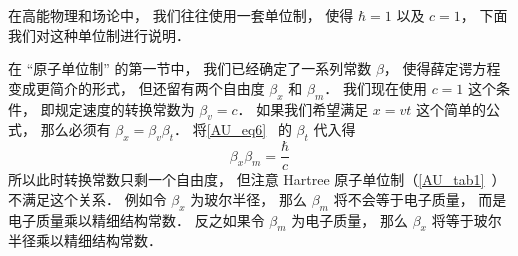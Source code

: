 

在高能物理和场论中， 我们往往使用一套单位制， 使得 $\hbar = 1$ 以及 $c = 1$， 下面我们对这种单位制进行说明．

在 “原子单位制” 的第一节中， 我们已经确定了一系列常数 $\beta$， 使得薛定谔方程变成更简介的形式， 但还留有两个自由度 $\beta_x$ 和 $\beta_m$． 我们现在使用 $c = 1$ 这个条件， 即规定速度的转换常数为 $\beta_v = c$． 如果我们希望满足 $x = vt$ 这个简单的公式， 那么必须有 $\beta_x = \beta_v \beta _t$． 将\autoref{AU_eq6}~ 的 $\beta_t$ 代入得
\begin{equation}
\beta_x \beta_m = \frac{\hbar}{c}
\end{equation}
所以此时转换常数只剩一个自由度， 但注意 Hartree 原子单位制（\autoref{AU_tab1}~）不满足这个关系． 例如令 $\beta_x$ 为玻尔半径， 那么 $\beta_m$ 将不会等于电子质量， 而是电子质量乘以精细结构常数． 反之如果令 $\beta_m$ 为电子质量， 那么 $\beta_x$ 将等于玻尔半径乘以精细结构常数．
